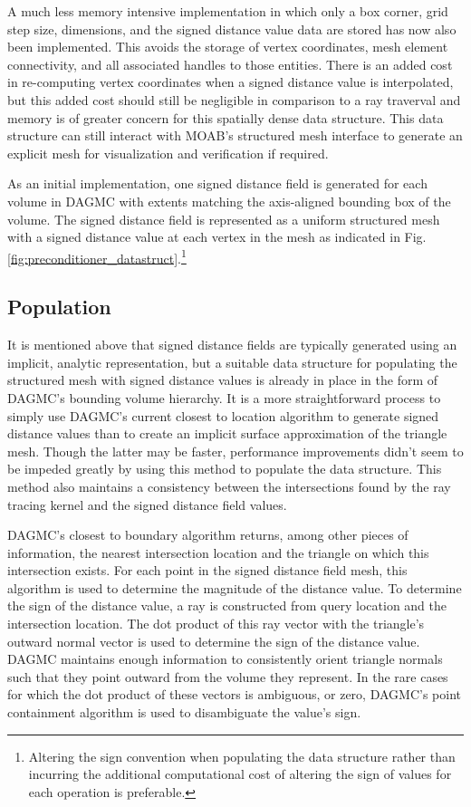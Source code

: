 A much less memory intensive implementation in which only a box
corner, grid step size, dimensions, and the signed distance value data are
stored has now also been implemented. This avoids the storage of vertex
coordinates, mesh element connectivity, and all associated handles to those
entities. There is an added cost in re-computing vertex coordinates when a
signed distance value is interpolated, but this added cost should still be
negligible in comparison to a ray traverval and memory is of greater concern for
this spatially dense data structure. This data structure can still interact with
MOAB's structured mesh interface to generate an explicit mesh for visualization
and verification if required.

As an initial implementation, one signed distance field is generated for each
volume in DAGMC with extents matching the axis-aligned bounding box of the
volume. The signed distance field is represented as a uniform structured mesh
with a signed distance value at each vertex in the mesh as indicated in Fig.
\ref{fig:preconditioner_datastruct}.\footnote{Altering the sign convention when
  populating the data structure rather than incurring the additional
  computational cost of altering the sign of values for each operation is
  preferable.}

\subsection{Population}

It is mentioned above that signed distance fields are typically
generated using an implicit, analytic representation, but a suitable data
structure for populating the structured mesh with signed distance values is
already in place in the form of DAGMC's bounding volume hierarchy. It is a more
straightforward process to simply use DAGMC's current closest to location
algorithm to generate signed distance values than to create an implicit surface
approximation of the triangle mesh. Though the latter may be faster,
performance improvements didn't seem to be impeded greatly by using this method
to populate the data structure. This method also maintains a consistency between
the intersections found by the ray tracing kernel and the signed distance field
values.

DAGMC's closest to boundary algorithm returns, among other pieces of
information, the nearest intersection location and the triangle on which this
intersection exists. For each point in the signed distance field mesh, this
algorithm is used to determine the magnitude of the distance value. To determine
the sign of the distance value, a ray is constructed from query location and the
intersection location. The dot product of this ray vector with the triangle's
outward normal vector is used to determine the sign of the distance value. DAGMC
maintains enough information to consistently orient triangle normals such that
they point outward from the volume they represent. In the rare cases for which
the dot product of these vectors is ambiguous, or zero, DAGMC's point
containment algorithm is used to disambiguate the value's sign.


